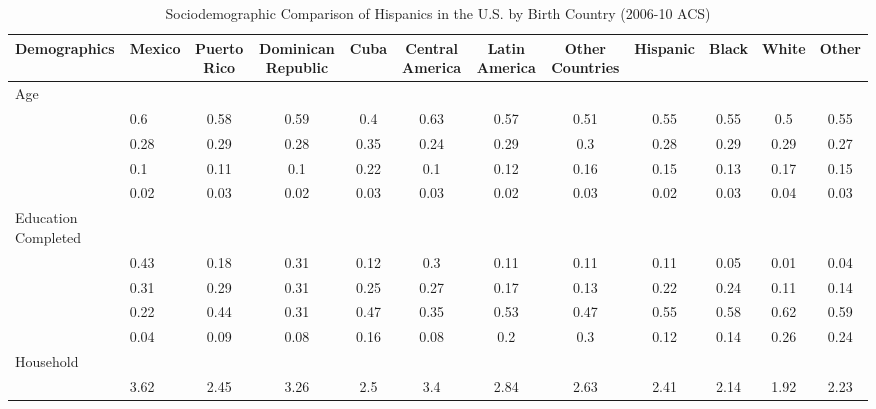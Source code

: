 \begin{table}[ht]
\centering
\caption{Sociodemographic Comparison of Hispanics in the U.S. by Birth Country (2006-10 ACS)} 
\begingroup\small
\begin{tabular}{>{\raggedright\arraybackslash}p{3.2cm}|lcccccc|cccc}
  \hline
Demographics & Mexico & Puerto Rico & Dominican Republic & Cuba & Central America & Latin America & Other Countries & Hispanic & Black & White & Other \\ 
  \hline
Age &  &  &  &  &  &  &  &  &  &  &  \\ 
  \multicolumn{1}{>{\raggedleft\arraybackslash}p{1.5cm}|}{\makebox[1.5cm][r]{60 - 69 }}& 0.6 & 0.58 & 0.59 & 0.4 & 0.63 & 0.57 & 0.51 & 0.55 & 0.55 & 0.5 & 0.55 \\ 
  \multicolumn{1}{>{\raggedleft\arraybackslash}p{1.5cm}|}{\makebox[1.5cm][r]{70 - 79 }}& 0.28 & 0.29 & 0.28 & 0.35 & 0.24 & 0.29 & 0.3 & 0.28 & 0.29 & 0.29 & 0.27 \\ 
  \multicolumn{1}{>{\raggedleft\arraybackslash}p{1.5cm}|}{\makebox[1.5cm][r]{80 - 89 }}& 0.1 & 0.11 & 0.1 & 0.22 & 0.1 & 0.12 & 0.16 & 0.15 & 0.13 & 0.17 & 0.15 \\ 
  \multicolumn{1}{>{\raggedleft\arraybackslash}p{1.5cm}|}{\makebox[1.5cm][r]{90 plus }}& 0.02 & 0.03 & 0.02 & 0.03 & 0.03 & 0.02 & 0.03 & 0.02 & 0.03 & 0.04 & 0.03 \\ 
  Education Completed &  &  &  &  &  &  &  &  &  &  &  \\ 
  \multicolumn{1}{>{\raggedleft\arraybackslash}p{3.2cm}|}{\makebox[3.2cm][r]{Less than Primary }}& 0.43 & 0.18 & 0.31 & 0.12 & 0.3 & 0.11 & 0.11 & 0.11 & 0.05 & 0.01 & 0.04 \\ 
  \multicolumn{1}{>{\raggedleft\arraybackslash}p{1.7cm}|}{\makebox[1.7cm][r]{Primary }}& 0.31 & 0.29 & 0.31 & 0.25 & 0.27 & 0.17 & 0.13 & 0.22 & 0.24 & 0.11 & 0.14 \\ 
  \multicolumn{1}{>{\raggedleft\arraybackslash}p{2cm}|}{\makebox[2cm][r]{Secondary }}& 0.22 & 0.44 & 0.31 & 0.47 & 0.35 & 0.53 & 0.47 & 0.55 & 0.58 & 0.62 & 0.59 \\ 
  \multicolumn{1}{>{\raggedleft\arraybackslash}p{2cm}|}{\makebox[2cm][r]{University }}& 0.04 & 0.09 & 0.08 & 0.16 & 0.08 & 0.2 & 0.3 & 0.12 & 0.14 & 0.26 & 0.24 \\ 
  Household &  &  &  &  &  &  &  &  &  &  &  \\ 
  \multicolumn{1}{>{\raggedleft\arraybackslash}p{2.7cm}|}{\makebox[2.7cm][r]{Household Size }}& 3.62 & 2.45 & 3.26 & 2.5 & 3.4 & 2.84 & 2.63 & 2.41 & 2.14 & 1.92 & 2.23 \\ 

\end{tabular}
\end{table}
